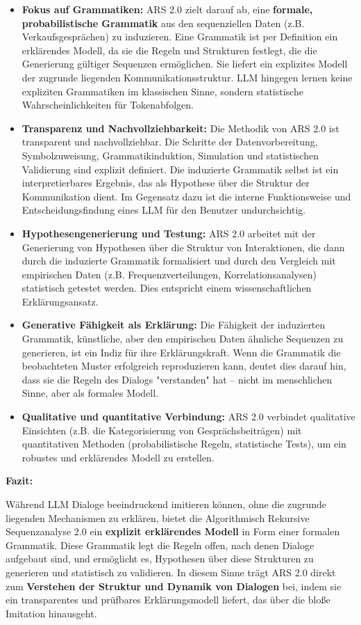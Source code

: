 \documentclass[
]{article}
\begin{document}
\begin{itemize}
\item
  \textbf{Fokus auf Grammatiken:} ARS 2.0 zielt darauf ab, eine
  \textbf{formale, probabilistische Grammatik} aus den sequenziellen
  Daten (z.B. Verkaufsgesprächen) zu induzieren. Eine Grammatik ist per
  Definition ein erklärendes Modell, da sie die Regeln und Strukturen
  festlegt, die die Generierung gültiger Sequenzen ermöglichen. Sie
  liefert ein explizites Modell der zugrunde liegenden
  Kommunikationsstruktur. LLM hingegen lernen keine expliziten
  Grammatiken im klassischen Sinne, sondern statistische
  Wahrscheinlichkeiten für Tokenabfolgen.
\item
  \textbf{Transparenz und Nachvollziehbarkeit:} Die Methodik von ARS 2.0
  ist transparent und nachvollziehbar. Die Schritte der
  Datenvorbereitung, Symbolzuweisung, Grammatikinduktion, Simulation und
  statistischen Validierung sind explizit definiert. Die induzierte
  Grammatik selbst ist ein interpretierbares Ergebnis, das als Hypothese
  über die Struktur der Kommunikation dient. Im Gegensatz dazu ist die
  interne Funktionsweise und Entscheidungsfindung eines LLM für den
  Benutzer undurchsichtig.
\item
  \textbf{Hypothesengenerierung und Testung:} ARS 2.0 arbeitet mit der
  Generierung von Hypothesen über die Struktur von Interaktionen, die
  dann durch die induzierte Grammatik formalisiert und durch den
  Vergleich mit empirischen Daten (z.B. Frequenzverteilungen,
  Korrelationsanalysen) statistisch getestet werden. Dies entspricht
  einem wissenschaftlichen Erklärungsansatz.
\item
  \textbf{Generative Fähigkeit als Erklärung:} Die Fähigkeit der
  induzierten Grammatik, künstliche, aber den empirischen Daten ähnliche
  Sequenzen zu generieren, ist ein Indiz für ihre Erklärungskraft. Wenn
  die Grammatik die beobachteten Muster erfolgreich reproduzieren kann,
  deutet dies darauf hin, dass sie die Regeln des Dialogs "verstanden"
  hat -- nicht im menschlichen Sinne, aber als formales Modell.
\item
  \textbf{Qualitative und quantitative Verbindung:} ARS 2.0 verbindet
  qualitative Einsichten (z.B. die Kategorisierung von
  Gesprächsbeiträgen) mit quantitativen Methoden (probabilistische
  Regeln, statistische Tests), um ein robustes und erklärendes Modell zu
  erstellen.
\end{itemize}

\textbf{Fazit:}

Während LLM Dialoge beeindruckend imitieren können, ohne die zugrunde
liegenden Mechanismen zu erklären, bietet die Algorithmisch Rekursive
Sequenzanalyse 2.0 ein \textbf{explizit erklärendes Modell} in Form
einer formalen Grammatik. Diese Grammatik legt die Regeln offen, nach
denen Dialoge aufgebaut sind, und ermöglicht es, Hypothesen über diese
Strukturen zu generieren und statistisch zu validieren. In diesem Sinne
trägt ARS 2.0 direkt zum \textbf{Verstehen der Struktur und Dynamik von
Dialogen} bei, indem sie ein transparentes und prüfbares
Erklärungsmodell liefert, das über die bloße Imitation hinausgeht.
\end{document}
